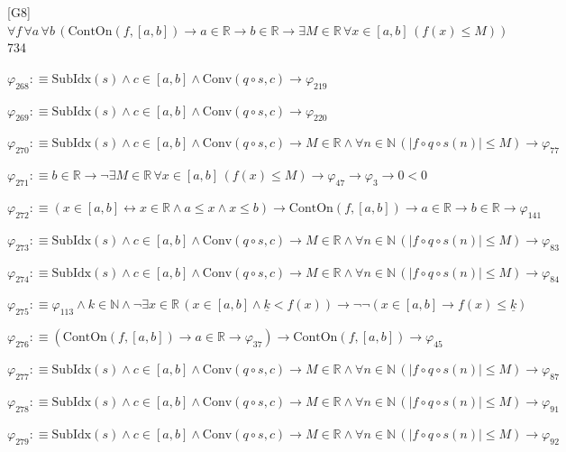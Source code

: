 \begin{fullproof}{[G8]}{$\forall f\,\forall a\,\forall b\,(\mathrm{ContOn}(f,[a,b]) \to a \in \mathbb{R} \to b \in \mathbb{R} \to \exists M \in \mathbb{R}\,\forall x \in [a,b]\,(f(x) \leq M))$}{734}
\begin{abbrevlist}
\item $\varphi_{268} :\equiv \mathrm{SubIdx}(s) \land c \in [a,b] \land \mathrm{Conv}(q \circ s,c) \to \varphi_{219}$
\item $\varphi_{269} :\equiv \mathrm{SubIdx}(s) \land c \in [a,b] \land \mathrm{Conv}(q \circ s,c) \to \varphi_{220}$
\item $\varphi_{270} :\equiv \mathrm{SubIdx}(s) \land c \in [a,b] \land \mathrm{Conv}(q \circ s,c) \to M \in \mathbb{R} \land \forall n \in \mathbb{N}\,(\lvert f \circ q \circ s(n) \rvert \leq M) \to \varphi_{77}$
\item $\varphi_{271} :\equiv b \in \mathbb{R} \to \neg \exists M \in \mathbb{R}\,\forall x \in [a,b]\,(f(x) \leq M) \to \varphi_{47} \to \varphi_{3} \to 0 < 0$
\item $\varphi_{272} :\equiv (x \in [a,b] \leftrightarrow x \in \mathbb{R} \land a \leq x \land x \leq b) \to \mathrm{ContOn}(f,[a,b]) \to a \in \mathbb{R} \to b \in \mathbb{R} \to \varphi_{141}$
\item $\varphi_{273} :\equiv \mathrm{SubIdx}(s) \land c \in [a,b] \land \mathrm{Conv}(q \circ s,c) \to M \in \mathbb{R} \land \forall n \in \mathbb{N}\,(\lvert f \circ q \circ s(n) \rvert \leq M) \to \varphi_{83}$
\item $\varphi_{274} :\equiv \mathrm{SubIdx}(s) \land c \in [a,b] \land \mathrm{Conv}(q \circ s,c) \to M \in \mathbb{R} \land \forall n \in \mathbb{N}\,(\lvert f \circ q \circ s(n) \rvert \leq M) \to \varphi_{84}$
\item $\varphi_{275} :\equiv \varphi_{113} \land k \in \mathbb{N} \land \neg \exists x \in \mathbb{R}\,(x \in [a,b] \land \underline{k} < f(x)) \to \neg \neg (x \in [a,b] \to f(x) \leq \underline{k})$
\item $\varphi_{276} :\equiv (\mathrm{ContOn}(f,[a,b]) \to a \in \mathbb{R} \to \varphi_{37}) \to \mathrm{ContOn}(f,[a,b]) \to \varphi_{45}$
\item $\varphi_{277} :\equiv \mathrm{SubIdx}(s) \land c \in [a,b] \land \mathrm{Conv}(q \circ s,c) \to M \in \mathbb{R} \land \forall n \in \mathbb{N}\,(\lvert f \circ q \circ s(n) \rvert \leq M) \to \varphi_{87}$
\item $\varphi_{278} :\equiv \mathrm{SubIdx}(s) \land c \in [a,b] \land \mathrm{Conv}(q \circ s,c) \to M \in \mathbb{R} \land \forall n \in \mathbb{N}\,(\lvert f \circ q \circ s(n) \rvert \leq M) \to \varphi_{91}$
\item $\varphi_{279} :\equiv \mathrm{SubIdx}(s) \land c \in [a,b] \land \mathrm{Conv}(q \circ s,c) \to M \in \mathbb{R} \land \forall n \in \mathbb{N}\,(\lvert f \circ q \circ s(n) \rvert \leq M) \to \varphi_{92}$

\end{abbrevlist}
\end{fullproof}
